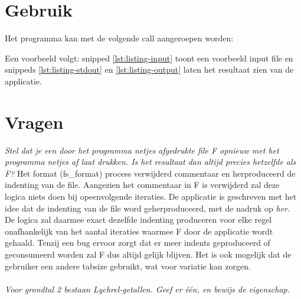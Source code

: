 \documentclass[10pt]{article}
\begin{document}
\section{Gebruik}
Het programma kan met de volgende call aangeroepen worden:


Een voorbeeld volgt: snipped \ref{lst:listing-input} toont een voorbeeld input file en snippeds \ref{lst:listing-stdout} en \ref{lst:listing-output} laten het resultaat zien van de applicatie.





\section{Vragen}
\textit{Stel dat je een door het programma netjes afgedrukte file F opnieuw met het programma netjes af laat drukken. Is het resultaat dan altijd precies hetzelfde als F?}
\newline Het format (fs\_format) process verwijderd commentaar en herproduceerd de indenting van de file. 
Aangezien het commentaar in F is verwijderd zal deze logica niets doen bij opeenvolgende iteraties.
De applicatie is geschreven met het idee dat de indenting van de file word geherproduceerd, 
met de nadruk op \textit{her}. De logica zal daarmee exact dezelfde indenting produceren voor elke 
regel onafhankelijk van het aantal iteraties waarmee F door de applicatie wordt gehaald.
Tenzij een bug ervoor zorgt dat er meer indents geproduceerd of geconsumeerd worden zal 
F dus altijd gelijk blijven. Het is ook mogelijk dat de gebruiker een andere tabsize gebruikt, 
wat voor variatie kan zorgen.
\\ \hfill \\
\textit{Voor grondtal 2 bestaan Lychrel-getallen. Geef er één, en bewijs de eigenschap.}
\newline 
\end{document}
